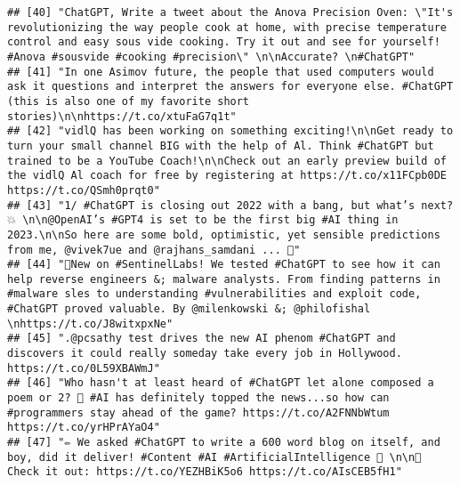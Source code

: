 \documentclass[
]{article}
\begin{document}
\begin{verbatim}
## [40] "ChatGPT, Write a tweet about the Anova Precision Oven: \"It's revolutionizing the way people cook at home, with precise temperature control and easy sous vide cooking. Try it out and see for yourself! #Anova #sousvide #cooking #precision\" \n\nAccurate? \n#ChatGPT"                                                       
## [41] "In one Asimov future, the people that used computers would ask it questions and interpret the answers for everyone else. #ChatGPT (this is also one of my favorite short stories)\n\nhttps://t.co/xtuFaG7q1t"                                                                                                                   
## [42] "vidlQ has been working on something exciting!\n\nGet ready to turn your small channel BIG with the help of Al. Think #ChatGPT but trained to be a YouTube Coach!\n\nCheck out an early preview build of the vidlQ Al coach for free by registering at https://t.co/x11FCpb0DE https://t.co/QSmh0prqt0"                          
## [43] "1/ #ChatGPT is closing out 2022 with a bang, but what’s next? 💥 \n\n@OpenAI’s #GPT4 is set to be the first big #AI thing in 2023.\n\nSo here are some bold, optimistic, yet sensible predictions from me, @vivek7ue and @rajhans_samdani ... 👀"                                                                               
## [44] "🤖New on #SentinelLabs! We tested #ChatGPT to see how it can help reverse engineers &; malware analysts. From finding patterns in #malware sles to understanding #vulnerabilities and exploit code, #ChatGPT proved valuable. By @milenkowski &; @philofishal \nhttps://t.co/J8witxpxNe"                                        
## [45] ".@pcsathy test drives the new AI phenom #ChatGPT and discovers it could really someday take every job in Hollywood. https://t.co/0L59XBAWmJ"                                                                                                                                                                                    
## [46] "Who hasn't at least heard of #ChatGPT let alone composed a poem or 2? 🙋 #AI has definitely topped the news...so how can #programmers stay ahead of the game? https://t.co/A2FNNbWtum https://t.co/yrHPrAYaO4"                                                                                                                  
## [47] "✏️ We asked #ChatGPT to write a 600 word blog on itself, and boy, did it deliver! #Content #AI #ArtificialIntelligence 📃 \n\n🤖 Check it out: https://t.co/YEZHBiK5o6 https://t.co/AIsCEB5fH1"                                                                                                                                  

\end{verbatim}
\end{document}
